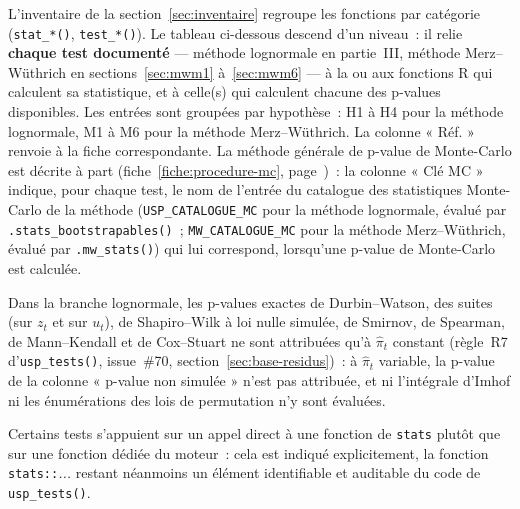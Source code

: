 \documentclass[a4paper,11pt]{article}
\newcommand{\code}[1]{\texttt{\small #1}}
\begin{document}
L'inventaire de la section~\ref{sec:inventaire} regroupe les fonctions par catégorie
(\code{stat\_*()}, \code{test\_*()}). Le tableau ci-dessous descend d'un niveau~:
il relie \textbf{chaque test documenté} --- méthode lognormale en partie~III,
méthode Merz--Wüthrich en sections~\ref{sec:mwm1} à~\ref{sec:mwm6} --- à la ou aux fonctions R
qui calculent sa statistique, et à celle(s) qui calculent chacune des p-values
disponibles. Les entrées sont groupées par hypothèse~: H1 à H4 pour la méthode
lognormale, M1 à M6 pour la méthode Merz--Wüthrich. La colonne « Réf. » renvoie à la fiche correspondante. La méthode
générale de p-value de Monte-Carlo est décrite à part
(fiche~\ref{fiche:procedure-mc}, page~\pageref{fiche:procedure-mc})~: la colonne « Clé MC » indique,
pour chaque test, le nom de l'entrée du catalogue des statistiques Monte-Carlo de la méthode
(\code{USP\_CATALOGUE\_MC} pour la méthode lognormale, évalué par
\code{.stats\_bootstrapables()}~; \code{MW\_CATALOGUE\_MC} pour la méthode Merz--Wüthrich,
évalué par \code{.mw\_stats()}) qui lui correspond, lorsqu'une p-value de Monte-Carlo est
calculée.

Dans la branche lognormale, les p-values exactes de Durbin--Watson, des suites (sur $z_t$ et
sur $u_t$), de Shapiro--Wilk à loi nulle simulée, de Smirnov, de Spearman, de Mann--Kendall et de
Cox--Stuart ne sont attribuées qu'à $\hat\pi_t$ constant (règle~R7 d'\code{usp\_tests()},
issue~\#70, section~\ref{sec:base-residus})~: à $\hat\pi_t$ variable, la p-value de la colonne
« p-value non simulée » n'est pas attribuée, et ni l'intégrale d'Imhof ni les énumérations des
lois de permutation n'y sont évaluées.

Certains tests s'appuient sur un appel direct à une fonction de \code{stats}
plutôt que sur une fonction dédiée du moteur~: cela est indiqué explicitement,
la fonction \code{stats::}\emph{...} restant néanmoins un élément identifiable et
auditable du code de \code{usp\_tests()}.
\end{document}

